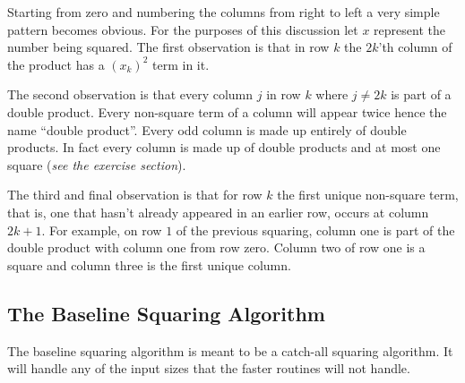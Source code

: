 \documentclass[b5paper]{book}
\begin{document}
Starting from zero and numbering the columns from right to left a very simple pattern becomes obvious.  For the purposes of this discussion let $x$
represent the number being squared.  The first observation is that in row $k$ the $2k$'th column of the product has a $\left (x_k \right)^2$ term in it.  

The second observation is that every column $j$ in row $k$ where $j \ne 2k$ is part of a double product.  Every non-square term of a column will
appear twice hence the name ``double product''.  Every odd column is made up entirely of double products.  In fact every column is made up of double 
products and at most one square (\textit{see the exercise section}).  

The third and final observation is that for row $k$ the first unique non-square term, that is, one that hasn't already appeared in an earlier row, 
occurs at column $2k + 1$.  For example, on row $1$ of the previous squaring, column one is part of the double product with column one from row zero. 
Column two of row one is a square and column three is the first unique column.

\subsection{The Baseline Squaring Algorithm}
The baseline squaring algorithm is meant to be a catch-all squaring algorithm.  It will handle any of the input sizes that the faster routines
will not handle.  
\end{document}
